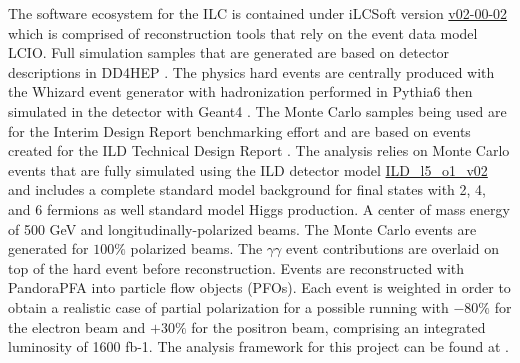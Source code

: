 



The software ecosystem for the ILC is contained under iLCSoft \cite{ilcsoft} version \url{v02-00-02} which is comprised of reconstruction tools that rely on the event data model LCIO\cite{lcio}. Full simulation samples that are generated are based on detector descriptions in DD4HEP \cite{dd4hep}. The physics hard events are centrally produced with the Whizard event generator \cite{ whizard} with hadronization performed in Pythia6 \cite{pythia6} then simulated in the detector with Geant4 \cite{geant4}. The Monte Carlo samples being used are for the Interim Design Report benchmarking effort \cite{ILDIDR} and are based on events created for the ILD Technical Design Report \cite{tdrdet}. The analysis relies on Monte Carlo events that are fully simulated using the ILD detector model \url{ ILD_l5_o1_v02 } and includes a complete standard model background for final states with 2, 4, and 6 fermions as well standard model Higgs production.  A center of mass energy of 500 GeV and longitudinally-polarized beams. The Monte Carlo events are generated for $100\%$ polarized beams. The $\gamma \gamma$ event contributions are overlaid on top of the hard event before reconstruction. Events are reconstructed with PandoraPFA \cite{particleflowA} into particle flow objects (PFOs). Each event is weighted in order to obtain a realistic case of partial polarization for a possible running with $-80\%$ for the electron beam and $+30\%$ for the positron beam, comprising an integrated luminosity of 1600 fb-1.  The analysis framework for this project can be found at \cite{wwrepo}. 


